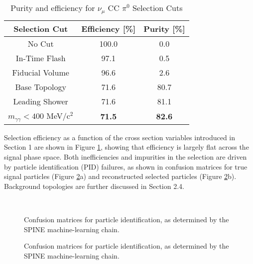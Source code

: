 \documentclass[../main.tex]{subfiles}
\begin{document}
\begin{table}[H]
    \caption{Purity and efficiency for $\nu_{\mu}$ CC $\pi^{0}$ Selection Cuts}
    \vspace{0.1cm}
    \centering
    \begin{tabular}{ c c c } 
    \hline
    Selection Cut & Efficiency [\%] & Purity [\%]  \\
    \hline
    No Cut & 100.0 & 0.0 \\ 
    In-Time Flash & 97.1 & 0.5 \\
    Fiducial Volume & 96.6 & 2.6 \\
    Base Topology & 71.6 & 80.7 \\
    Leading Shower & 71.6 & 81.1 \\
    $m_{\gamma \gamma} < 400$ MeV/c$^{2}$ & \textbf{71.5} & \textbf{82.6} \\
    \hline
    \end{tabular}
    \label{Tab:pureff}
\end{table}

Selection efficiency as a function of the cross section variables introduced in Section 1 are shown in Figure \ref{fig:sel_efficiency_plots}, showing that efficiency is largely flat across the signal phase space.  Both inefficiencies and impurities in the selection are driven by particle identification (PID) failures, as shown in confusion matrices for true signal particles (Figure \ref{fig:sel_pid_confusion}a) and reconstructed selected particles (Figure \ref{fig:sel_pid_confusion}b).  Background topologies are further discussed in Section 2.4.

\begin{figure}[H]
    \center
     \\
    \caption{Confusion matrices for particle identification, as determined by the SPINE machine-learning chain.}
    \label{fig:sel_efficiency_plots}
\end{figure}

\begin{figure}[H]
    \center
    \caption{Confusion matrices for particle identification, as determined by the SPINE machine-learning chain.}
    \label{fig:sel_pid_confusion}
\end{figure}
\end{document}
